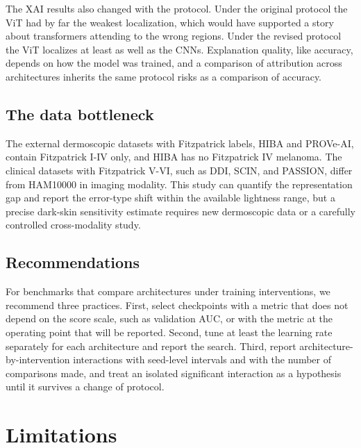 \documentclass[11pt]{article}
\begin{document}
The XAI results also changed with the protocol. Under the original protocol the ViT had by far the weakest localization, which would have supported a story about transformers attending to the wrong regions. Under the revised protocol the ViT localizes at least as well as the CNNs. Explanation quality, like accuracy, depends on how the model was trained, and a comparison of attribution across architectures inherits the same protocol risks as a comparison of accuracy.

\subsection{The data bottleneck}

The external dermoscopic datasets with Fitzpatrick labels, HIBA and PROVe-AI, contain Fitzpatrick I-IV only, and HIBA has no Fitzpatrick IV melanoma. The clinical datasets with Fitzpatrick V-VI, such as DDI, SCIN, and PASSION, differ from HAM10000 in imaging modality. This study can quantify the representation gap and report the error-type shift within the available lightness range, but a precise dark-skin sensitivity estimate requires new dermoscopic data or a carefully controlled cross-modality study.

\subsection{Recommendations}

For benchmarks that compare architectures under training interventions, we recommend three practices. First, select checkpoints with a metric that does not depend on the score scale, such as validation AUC, or with the metric at the operating point that will be reported. Second, tune at least the learning rate separately for each architecture and report the search. Third, report architecture-by-intervention interactions with seed-level intervals and with the number of comparisons made, and treat an isolated significant interaction as a hypothesis until it survives a change of protocol.

\section{Limitations}
\end{document}
